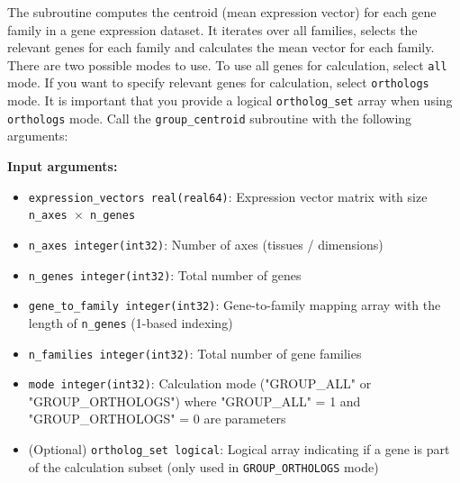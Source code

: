 \documentclass[11pt]{article}
\begin{document}
\begin{enumerate}
\begin{enumerate}
	      	      The subroutine computes the centroid (mean expression vector) for each
	      	      gene family in a gene expression dataset. It iterates over all
	      	      families, selects the relevant genes for each family and calculates the
	      	      mean vector for each family. There are two possible modes to use. To use
	      	      all genes for calculation, select \texttt{all} mode. If you want to
	      	      specify relevant genes for calculation, select \texttt{orthologs} mode.
	      	      It is important that you provide a logical \texttt{ortholog\_set}
	      	      array when using \texttt{orthologs} mode. Call the \texttt{group\_centroid}
	      	      subroutine with the following arguments:
	      	      
	      	      \textbf{Input arguments:}
	      	      \begin{itemize}
	      	      	\item \texttt{expression\_vectors real(real64)}: Expression vector matrix
	      	      	      with size \texttt{n\_axes $\times$ n\_genes}
	      	      	      
	      	      	\item \texttt{n\_axes integer(int32)}: Number of axes (tissues /
	      	      	      dimensions)
	      	      	      
	      	      	\item \texttt{n\_genes integer(int32)}: Total number of genes
	      	      	      
	      	      	\item \texttt{gene\_to\_family integer(int32)}: Gene-to-family mapping
	      	      	      array with the length of \texttt{n\_genes} (1-based indexing)
	      	      	      
	      	      	\item \texttt{n\_families integer(int32)}: Total number of gene families
	      	      	      
	      	      	\item \texttt{mode integer(int32)}: Calculation mode ("GROUP\_ALL" or "GROUP\_ORTHOLOGS") where "GROUP\_ALL" = 1 and "GROUP\_ORTHOLOGS" = 0 are parameters
	      	      	      
	      	      	\item (Optional) \texttt{ortholog\_set logical}: Logical array indicating
	      	      	      if a gene is part of the calculation subset (only used in \texttt{GROUP\_ORTHOLOGS}
	      	      	      mode)
	      	      \end{itemize}
	      	      

\end{enumerate}
\end{enumerate}
\end{document}

